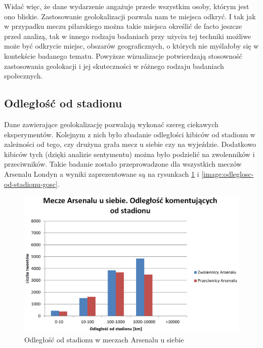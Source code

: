 Widać więc, że dane wydarzenie angażuje przede wszystkim osoby, którym jest ono
bliskie. Zastosowanie geolokalizacji pozwala nam te miejsca odkryć. I tak jak w
przypadku meczu piłarskiego można takie miejsca określić de facto jeszcze przed
analizą, tak w innego rodzaju badaniach przy użyciu tej techniki możliwe może
być odkrycie miejsc, obszarów geograficznych, o których nie myślałoby się w
kontekście badanego tematu. Powyższe wizualizacje potwierdzają stosowność
zastosowania geolokacji i jej skuteczności w różnego rodzaju badaniach
społecznych.

\subsection{Odległość od stadionu}
Dane zawierające geolokalizację pozwalają wykonać szereg ciekawych eksperymentów.
Kolejnym z nich było zbadanie odległości kibiców od stadionu w zależności
od tego, czy drużyna grała mecz u siebie czy na wyjeździe. Dodatkowo
kibiców tych (dzięki analizie sentymentu) można było podzielić na zwolenników
i przeciwników. Takie badanie zostało przeprowadzone dla wszystkich meczów
Arsenalu Londyn a wyniki zaprezentowane są na rysunkach 
\ref{image:odleglosc-od-stadionu-gospodarz} i \ref{image:odleglosc-od-stadionu-gosc}.

\begin{figure}[ht!]
\centering
\includegraphics[width=140mm]{img/odleglosc-od-stadionu-home.PNG}
\caption{Odległość od stadionu w meczach Arsenalu u siebie}
\label{image:odleglosc-od-stadionu-gospodarz}
\end{figure}

\clearpage

